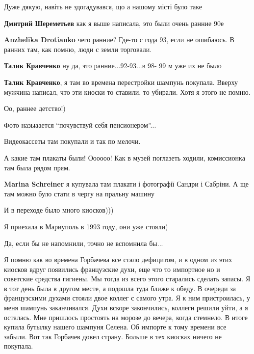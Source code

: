
Дуже дякую, навіть не здогадувався, що а нашому місті було таке

\begin{itemize} %
\textbf{Дмитрий Шереметьев} как я выше написала, это были очень ранние 90е🤗

\textbf{Anzhelika Drotianko} чего ранние? Где-то с года 93, если не ошибаюсь. В ранних там, как помню, люди с земли торговали.

\textbf{Талик Кравченко} ну да, это ранние...92-93...в 98- 99 м уже их не было

\textbf{Талик Кравченко}, я там во времена перестройки шампунь покупала. Вверху мужчина написал, что эти киоски то ставили, то убирали. Хотя я этого не помню.
\end{itemize} %


Оо, раннее детство!)


Фото назыаается \enquote{почувствуй себя пенсионером}...🤣


Видеокассеты там покупали и так по мелочи.


А какие там плакаты были! Оооооо! Как в музей поглазеть ходили, комиссионка там
была рядом прям.

\begin{itemize} %
\textbf{Marina Schreiner} я купувала там плакати і фотографії Сандри і Сабріни. А ще там можно було стати в чергу на пральну машину
\end{itemize} %


И в переходе было много киосков)))


Я приехала в Мариуполь в 1993 году, они уже стояли)


Да, если бы не напомнили, точно не вспомнила бы...


Я помню как во времена Горбачева все стало дефицитом, и в одном из этих киосков
вдруг появились французские духи, еще что то импортное но и советские средства
гигиены. Мы тогда из всего этого старались сделать запасы. Я в тот день была в
другом месте, а подошла туда ближе к обеду. В очереди за французскими духами
стояли двое коллег с самого утра. Я к ним пристроилась, у меня шампунь
заканчивался. Духи вскоре закончились, коллеги решили уйти, а я осталась. Мне
пришлось простоять на морозе до вечера, когда стемнело. В итоге купила бутылку
нашего шампуня Селена. Об импорте к тому времени все забыли. Вот так Горбачев
довел страну. Больше в тех киосках ничего не покупала.

